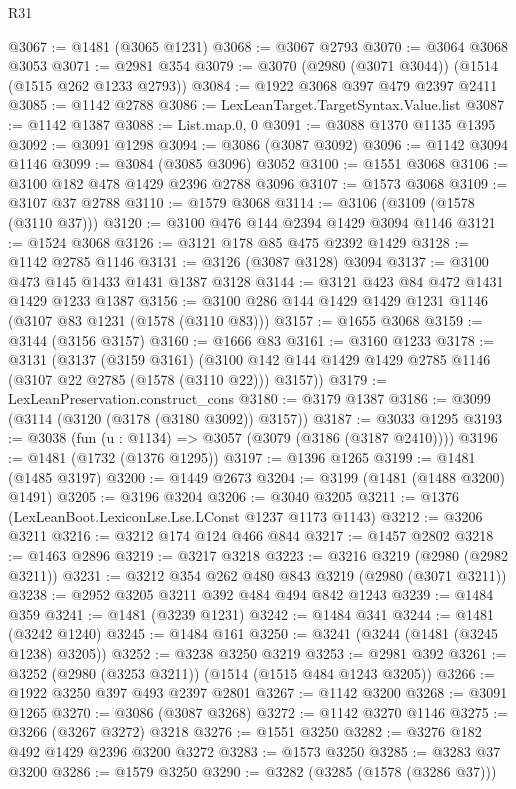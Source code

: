 \begin{lexlean}{R31}
\begin{coremodule}
@3067 := @1481 (@3065 @1231)
@3068 := @3067 @2793
@3070 := @3064 @3068 @3053
@3071 := @2981 @354
@3079 := @3070 (@2980 (@3071 @3044)) (@1514 (@1515 @262 @1233 @2793))
@3084 := @1922 @3068 @397 @479 @2397 @2411
@3085 := @1142 @2788
@3086 := LexLeanTarget.TargetSyntax.Value.list
@3087 := @1142 @1387
@3088 := List.map.{0, 0}
@3091 := @3088 @1370 @1135 @1395
@3092 := @3091 @1298
@3094 := @3086 (@3087 @3092)
@3096 := @1142 @3094 @1146
@3099 := @3084 (@3085 @3096) @3052
@3100 := @1551 @3068
@3106 := @3100 @182 @478 @1429 @2396 @2788 @3096
@3107 := @1573 @3068
@3109 := @3107 @37 @2788
@3110 := @1579 @3068
@3114 := @3106 (@3109 (@1578 (@3110 @37)))
@3120 := @3100 @476 @144 @2394 @1429 @3094 @1146
@3121 := @1524 @3068
@3126 := @3121 @178 @85 @475 @2392 @1429
@3128 := @1142 @2785 @1146
@3131 := @3126 (@3087 @3128) @3094
@3137 := @3100 @473 @145 @1433 @1431 @1387 @3128
@3144 := @3121 @423 @84 @472 @1431 @1429 @1233 @1387
@3156 := @3100 @286 @144 @1429 @1429 @1231 @1146 (@3107 @83 @1231 (@1578 (@3110 @83)))
@3157 := @1655 @3068
@3159 := @3144 (@3156 @3157)
@3160 := @1666 @83
@3161 := @3160 @1233
@3178 := @3131
    (@3137
      (@3159 @3161)
      (@3100 @142 @144 @1429 @1429 @2785 @1146 (@3107 @22 @2785 (@1578 (@3110 @22))) @3157))
@3179 := LexLeanPreservation.construct_cons
@3180 := @3179 @1387
@3186 := @3099 (@3114 (@3120 (@3178 (@3180 @3092)) @3157))
@3187 := @3033 @1295
@3193 := @3038 (fun (u : @1134) => @3057 (@3079 (@3186 (@3187 @2410))))
@3196 := @1481 (@1732 (@1376 @1295))
@3197 := @1396 @1265
@3199 := @1481 (@1485 @3197)
@3200 := @1449 @2673
@3204 := @3199 (@1481 (@1488 @3200) @1491)
@3205 := @3196 @3204
@3206 := @3040 @3205
@3211 := @1376 (LexLeanBoot.LexiconLse.Lse.LConst @1237 @1173 @1143)
@3212 := @3206 @3211
@3216 := @3212 @174 @124 @466 @844
@3217 := @1457 @2802
@3218 := @1463 @2896
@3219 := @3217 @3218
@3223 := @3216 @3219 (@2980 (@2982 @3211))
@3231 := @3212 @354 @262 @480 @843 @3219 (@2980 (@3071 @3211))
@3238 := @2952 @3205 @3211 @392 @484 @494 @842 @1243
@3239 := @1484 @359
@3241 := @1481 (@3239 @1231)
@3242 := @1484 @341
@3244 := @1481 (@3242 @1240)
@3245 := @1484 @161
@3250 := @3241 (@3244 (@1481 (@3245 @1238) @3205))
@3252 := @3238 @3250 @3219
@3253 := @2981 @392
@3261 := @3252 (@2980 (@3253 @3211)) (@1514 (@1515 @484 @1243 @3205))
@3266 := @1922 @3250 @397 @493 @2397 @2801
@3267 := @1142 @3200
@3268 := @3091 @1265
@3270 := @3086 (@3087 @3268)
@3272 := @1142 @3270 @1146
@3275 := @3266 (@3267 @3272) @3218
@3276 := @1551 @3250
@3282 := @3276 @182 @492 @1429 @2396 @3200 @3272
@3283 := @1573 @3250
@3285 := @3283 @37 @3200
@3286 := @1579 @3250
@3290 := @3282 (@3285 (@1578 (@3286 @37)))

\end{coremodule}
\end{lexlean}
